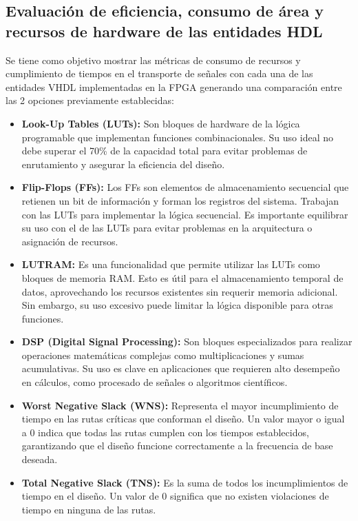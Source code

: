 \documentclass[conference]{IEEEtran}
\begin{document}
\subsection{Evaluación de eficiencia, consumo de área y recursos de hardware de las entidades HDL}
Se tiene como objetivo mostrar las métricas de consumo de recursos y cumplimiento de tiempos en el transporte de señales con cada una de las entidades VHDL implementadas en la FPGA generando una comparación entre las 2 opciones previamente establecidas:

\begin{itemize}
    \item \textbf{Look-Up Tables (LUTs):} 
    Son bloques de hardware de la lógica programable que implementan funciones combinacionales. Su uso ideal no debe superar el 70\% de la capacidad total para evitar problemas de enrutamiento y asegurar la eficiencia del diseño.  
    
    \item \textbf{Flip-Flops (FFs):} 
    Los FFs son elementos de almacenamiento secuencial que retienen un bit de información y forman los registros del sistema. Trabajan con las LUTs para implementar la lógica secuencial. Es importante equilibrar su uso con el de las LUTs para evitar problemas en la arquitectura o asignación de recursos.

    \item \textbf{LUTRAM:} 
    Es una funcionalidad que permite utilizar las LUTs como bloques de memoria RAM. Esto es útil para el almacenamiento temporal de datos, aprovechando los recursos existentes sin requerir memoria adicional. Sin embargo, su uso excesivo puede limitar la lógica disponible para otras funciones.

    \item \textbf{DSP (Digital Signal Processing):} 
    Son bloques especializados para realizar operaciones matemáticas complejas como multiplicaciones y sumas acumulativas. Su uso es clave en aplicaciones que requieren alto desempeño en cálculos, como procesado de señales o algoritmos científicos.

    \item \textbf{Worst Negative Slack (WNS):} 
    Representa el mayor incumplimiento de tiempo en las rutas críticas que conforman el diseño. Un valor mayor o igual a 0 indica que todas las rutas cumplen con los tiempos establecidos, garantizando que el diseño funcione correctamente a la frecuencia de base deseada.

    \item \textbf{Total Negative Slack (TNS):} 
    Es la suma de todos los incumplimientos de tiempo en el diseño. Un valor de 0 significa que no existen violaciones de tiempo en ninguna de las rutas.\cite{xilinx_clb_guide}
\end{itemize}
\end{document}
